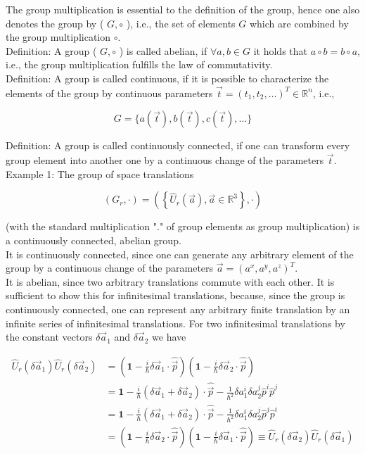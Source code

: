\documentclass[10pt, letterpaper]{article}
\begin{document}
The group multiplication is essential to the definition of the group, hence one also denotes the group by ( $G, \circ$ ), i.e., the set of elements $G$ which are combined by the group multiplication $\circ$.\\
Definition: A group ( $G, \circ$ ) is called abelian, if $\forall a, b \in G$ it holds that $a \circ b=b \circ a$, i.e., the group multiplication fulfills the law of commutativity.\\
Definition: A group is called continuous, if it is possible to characterize the elements of the group by continuous parameters $\vec{t}=\left(t_{1}, t_{2}, \ldots\right)^{T} \in \mathbb{R}^{n}$, i.e.,

$$
G=\{a(\vec{t}), b(\vec{t}), c(\vec{t}), \ldots\}
$$

Definition: A group is called continuously connected, if one can transform every group element into another one by a continuous change of the parameters $\vec{t}$.\\
Example 1: The group of space translations

$$
\left(G_{r}, \cdot\right)=\left(\left\{\hat{U}_{r}(\vec{a}), \vec{a} \in \mathbb{R}^{3}\right\}, \cdot\right)
$$

(with the standard multiplication "." of group elements as group multiplication) is a continuously connected, abelian group.\\
It is continuously connected, since one can generate any arbitrary element of the group by a continuous change of the parameters $\vec{a}=\left(a^{x}, a^{y}, a^{z}\right)^{T}$.\\
It is abelian, since two arbitrary translations commute with each other. It is sufficient to show this for infinitesimal translations, because, since the group is continuously connected, one can represent any arbitrary finite translation by an infinite series of infinitesimal translations. For two infinitesimal translations by the constant vectors $\delta \vec{a}_{1}$ and $\delta \vec{a}_{2}$ we have

$$
\begin{aligned}
\hat{U}_{r}\left(\delta \vec{a}_{1}\right) \hat{U}_{r}\left(\delta \vec{a}_{2}\right) & =\left(\mathbf{1}-\frac{i}{\hbar} \delta \vec{a}_{1} \cdot \hat{\vec{p}}\right)\left(\mathbf{1}-\frac{i}{\hbar} \delta \vec{a}_{2} \cdot \hat{\vec{p}}\right) \\
& =\mathbf{1}-\frac{i}{\hbar}\left(\delta \vec{a}_{1}+\delta \vec{a}_{2}\right) \cdot \hat{\vec{p}}-\frac{1}{\hbar^{2}} \delta a_{1}^{i} \delta a_{2}^{j} \hat{p}^{i} \hat{p}^{j} \\
& =\mathbf{1}-\frac{i}{\hbar}\left(\delta \vec{a}_{1}+\delta \vec{a}_{2}\right) \cdot \hat{\vec{p}}-\frac{1}{\hbar^{2}} \delta a_{1}^{i} \delta a_{2}^{j} \hat{p}^{j} \hat{p}^{i} \\
& =\left(\mathbf{1}-\frac{i}{\hbar} \delta \vec{a}_{2} \cdot \hat{\vec{p}}\right)\left(\mathbf{1}-\frac{i}{\hbar} \delta \vec{a}_{1} \cdot \hat{\vec{p}}\right) \equiv \hat{U}_{r}\left(\delta \vec{a}_{2}\right) \hat{U}_{r}\left(\delta \vec{a}_{1}\right)
\end{aligned}
$$
\end{document}
